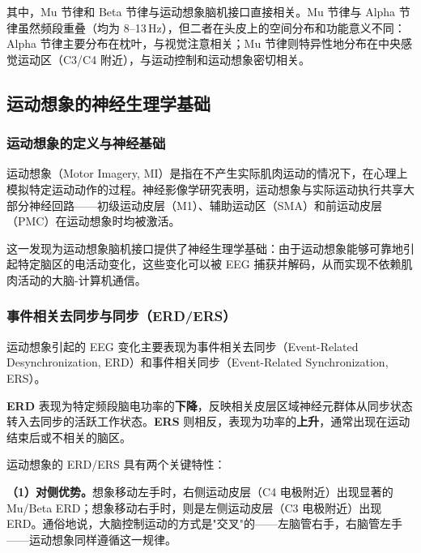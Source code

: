 其中，Mu 节律和 Beta 节律与运动想象脑机接口直接相关。Mu 节律与 Alpha 节律虽然频段重叠（均为 8--13\,Hz），但二者在头皮上的空间分布和功能意义不同：Alpha 节律主要分布在枕叶，与视觉注意相关；Mu 节律则特异性地分布在中央感觉运动区（C3/C4 附近），与运动控制和运动想象密切相关。

\subsection{运动想象的神经生理学基础}
\label{sec:motor-imagery}

\subsubsection{运动想象的定义与神经基础}

运动想象（Motor Imagery, MI）是指在不产生实际肌肉运动的情况下，在心理上模拟特定运动动作的过程。神经影像学研究表明，运动想象与实际运动执行共享大部分神经回路——初级运动皮层（M1）、辅助运动区（SMA）和前运动皮层（PMC）在运动想象时均被激活。

这一发现为运动想象脑机接口提供了神经生理学基础：由于运动想象能够可靠地引起特定脑区的电活动变化，这些变化可以被 EEG 捕获并解码，从而实现不依赖肌肉活动的大脑-计算机通信。

\subsubsection{事件相关去同步与同步（ERD/ERS）}

运动想象引起的 EEG 变化主要表现为事件相关去同步（Event-Related Desynchronization, ERD）和事件相关同步（Event-Related Synchronization, ERS）。

\textbf{ERD} 表现为特定频段脑电功率的\textbf{下降}，反映相关皮层区域神经元群体从同步状态转入去同步的活跃工作状态。\textbf{ERS} 则相反，表现为功率的\textbf{上升}，通常出现在运动结束后或不相关的脑区。

运动想象的 ERD/ERS 具有两个关键特性：

\textbf{（1）对侧优势。}想象移动左手时，右侧运动皮层（C4 电极附近）出现显著的 Mu/Beta ERD；想象移动右手时，则是左侧运动皮层（C3 电极附近）出现 ERD。通俗地说，大脑控制运动的方式是"交叉"的——左脑管右手，右脑管左手——运动想象同样遵循这一规律。

